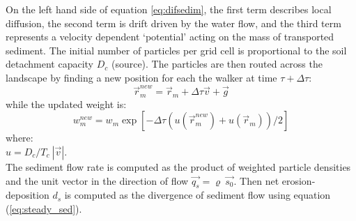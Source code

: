 \documentclass[gmd, manuscript]{copernicus}
\begin{document}
On the left hand side of equation \ref{eq:difsedim}, 
the first term describes local diffusion, 
the second term is drift driven by the water flow,
and the third term represents a velocity dependent `potential'
acting on the mass of transported sediment. 
The initial number of particles per grid cell 
is proportional to the soil detachment capacity $D_c$ (source).
The particles are then routed across the landscape
by finding a new position for each the walker at time $\tau + \Delta \tau$:
\begin{equation}
\vec{r}_m^{new}=\vec{r}_m + \Delta \tau \vec{v} + \vec{g}
\end{equation}
while the updated weight is:
\begin{equation}
w_m^{new}=w_m \exp[- \Delta \tau(u(\vec{r}_m^{new})+u(\vec{r}_m))/2]
\end{equation}
{\small
\noindent
where:\\
\noindent
\hspace*{0.5em} $u = {D_c / T_c}~|\vec{v}|$.\\
}
%
\noindent
The sediment flow rate is computed 
as the product of weighted particle densities 
and the unit vector in the direction of flow
$\vec{q_s} = \varrho~\vec{s_0}$.  %
Then net erosion-deposition $d_s$ 
is computed as the divergence of sediment flow using equation (\ref{eq:steady_sed}).
\end{document}

